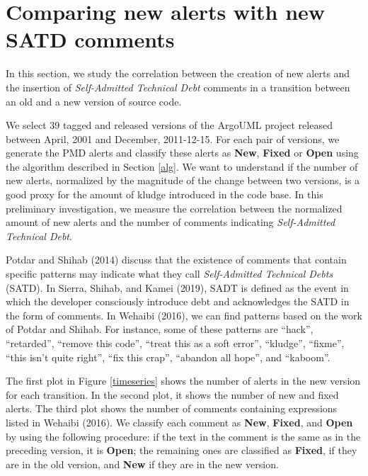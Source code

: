 \documentclass[
]{article}
\begin{document}
\normalsize

\section{Comparing new alerts with new SATD comments}\label{results}

In this section, we study the correlation between the creation of new
alerts and the insertion of \textit{Self-Admitted Technical Debt}
comments in a transition between an old and a new version of source
code.

We select 39 tagged and released versions of the ArgoUML project released 
between April, 2001 and December, 2011-12-15. For each pair of
versions, we generate the PMD alerts and classify these
alerts as \textbf{New}, \textbf{Fixed} or \textbf{Open} using
the algorithm described in Section \ref{alg}. We want to understand if
the number of new alerts, normalized by the magnitude of the change
between two versions, is a good proxy for the amount of kludge
introduced in the code base. In this preliminary investigation, 
we measure the correlation between the normalized amount of new alerts
and the number of comments indicating \textit{Self-Admitted Technical Debt}.

Potdar and Shihab (2014) discuss that the existence of
comments that contain specific patterns may indicate what they call
\textit{Self-Admitted Technical Debts} (SATD). In Sierra, Shihab, and Kamei
(2019), SADT is defined as the event in which the developer consciously 
introduce debt and acknowledges the SATD in the form of comments. In 
Wehaibi (2016), we can find patterns based on the work of Potdar and Shihab. 
For instance, some of these patterns are ``hack'', ``retarded'', 
``remove this code'', ``treat this as a soft error'', ``kludge'', 
``fixme'', ``this isn't quite right'', ``fix this crap'', 
``abandon all hope'', and ``kaboom''.

The first plot in Figure \ref{timeseries} shows the number of alerts in
the new version for each transition. In the second plot, it shows the
number of new and fixed alerts. The third plot shows the number of
comments containing expressions listed in Wehaibi (2016). We classify
each comment as \textbf{New}, \textbf{Fixed}, and \textbf{Open} by using
the following procedure: if the text in the comment is the same as in
the preceding version, it is \textbf{Open}; the remaining ones are 
classified as \textbf{Fixed}, if they are in the old version, and 
\textbf{New} if they are in the new version.
\end{document}
